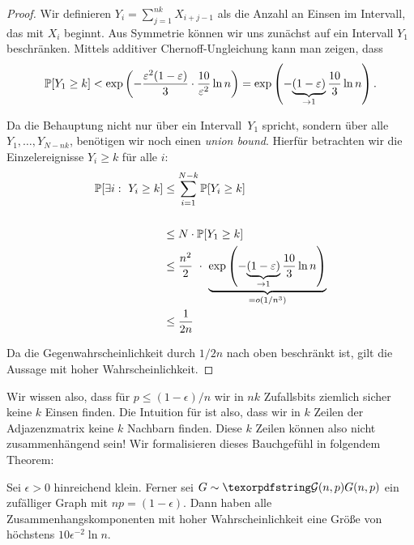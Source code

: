 \begin{proof}
    Wir definieren $Y_i = \sum_{j=1}^{nk} X_{i+j-1}$ als die Anzahl an Einsen im Intervall, das mit $X_i$ beginnt.
    Aus Symmetrie können wir uns zunächst auf ein Intervall $Y_1$ beschränken.
    Mittels additiver Chernoff-Ungleichung kann man zeigen, dass
    \begin{equation}
        \mathbb{P}\!\left[Y_1 \ge k\right] < \exp\left(-\frac{\varepsilon^2(1-\varepsilon)}{3} \cdot \frac{10}{\varepsilon^2} \ln n \right)
        = \exp\left(-\! \underbrace{(1-\varepsilon)}_{\to 1} \frac{10}{3} \ln n \right).
    \end{equation}

    Da die Behauptung nicht nur über ein Intervall~$Y_1$ spricht, sondern über alle $Y_1, \ldots, Y_{N-nk}$, benötigen wir noch einen \emph{union bound}.
    Hierfür betrachten wir die Einzelereignisse $Y_i \ge k$ für alle $i$:
    \begin{align}
        \prob{\exists i:\ Y_i \ge k} & \le \sum_{i=1}^{N-k} \prob{Y_i \ge k}                                                                                        \\                                                                      \\
                                     & \le N \cdot \prob{Y_1 \ge k}                                                                                                 \\
                                     & \le \frac{n^2}{2} \ \cdot\ \underbrace{\exp\left(-\! \underbrace{(1-\epsilon)}_{\to 1} \frac{10}{3} \ln n \right)}_{=o(1/n^3)} \\
                                     & \le \frac{1}{2n}
    \end{align}

    Da die Gegenwahrscheinlichkeit durch $1/2n$ nach oben beschränkt ist, gilt die Aussage mit hoher Wahrscheinlichkeit.
\end{proof}

Wir wissen also, dass für $p \le (1 - \epsilon) / n$ wir in $nk$ Zufallsbits ziemlich sicher keine $k$ Einsen finden.
Die Intuition für \Gnp ist also, dass wir in $k$ Zeilen der Adjazenzmatrix keine $k$ Nachbarn finden.
Diese $k$ Zeilen können also nicht zusammenhängend sein!
Wir formalisieren dieses Bauchgefühl in folgendem Theorem:

\begin{theorem}
    Sei  $\epsilon > 0$ hinreichend klein.
    Ferner sei $G \sim \Gnp$ ein zufälliger Graph mit $np = (1 - \epsilon)$.
    Dann haben alle Zusammenhangskomponenten mit hoher Wahrscheinlichkeit eine Größe von höchstens $10 \epsilon^{-2} \ln n$.
\end{theorem}

